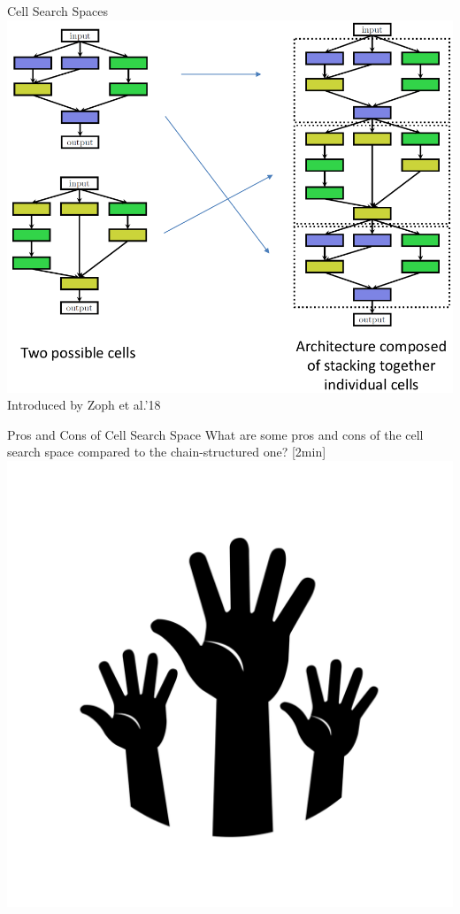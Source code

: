 \begin{frame}[c]{Cell Search Spaces}
\centering
\includegraphics[height=.8\textheight]{images_lec7/s26}\\
Introduced by Zoph et al.’18
\end{frame}
\begin{frame}[c]{Pros and Cons of Cell Search Space}
\centering
What are some pros and cons of the cell search space compared to the chain-structured one? [2min]\\
\includegraphics[height=.3\textheight]{images/hands.png}\\
\end{frame}
